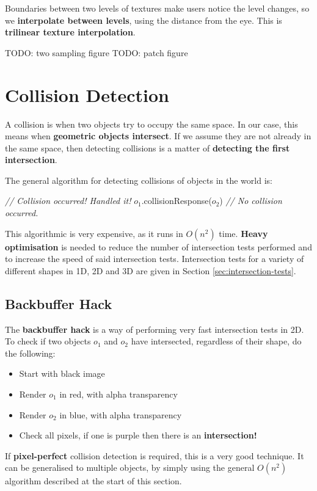 \documentclass{article}
\begin{document}
Boundaries between two levels of textures make users notice the level changes, so we \textbf{interpolate between levels}, using the distance from the eye. This is \textbf{trilinear texture interpolation}.

TODO: two sampling figure
TODO: patch figure

\section{Collision Detection}

A collision is when two objects try to occupy the same space. In our case, this means when \textbf{geometric objects intersect}. If we assume they are not already in the same space, then detecting collisions is a matter of \textbf{detecting the first intersection}.

The general algorithm for detecting collisions of objects in the world is:
\begin{algorithmic}[1]
			\STATE \textit{// Collision occurred! Handled it!}
			\STATE $o_1$.collisionResponse($o_2$)
		\ELSE
			\STATE \textit{// No collision occurred.}
		\ENDIF
	\ENDFOR
\ENDFOR
\end{algorithmic}

This algorithmic is very expensive, as it runs in $O(n^2)$ time. \textbf{Heavy optimisation} is needed to reduce the number of intersection tests performed and to increase the speed of said intersection tests. Intersection tests for a variety of different shapes in 1D, 2D and 3D are given in Section \ref{sec:intersection-tests}.

\subsection{Backbuffer Hack}

The \textbf{backbuffer hack} is a way of performing very fast intersection tests in 2D. To check if two objects $o_1$ and $o_2$ have intersected, regardless of their shape, do the following:
\begin{itemize}
	\item Start with black image
	\item Render $o_1$ in red, with alpha transparency
	\item Render $o_2$ in blue, with alpha transparency
	\item Check all pixels, if one is purple then there is an \textbf{intersection!}
\end{itemize}
If \textbf{pixel-perfect} collision detection is required, this is a very good technique. It can be generalised to multiple objects, by simply using the general $O(n^2)$ algorithm described at the start of this section.
\end{document}
